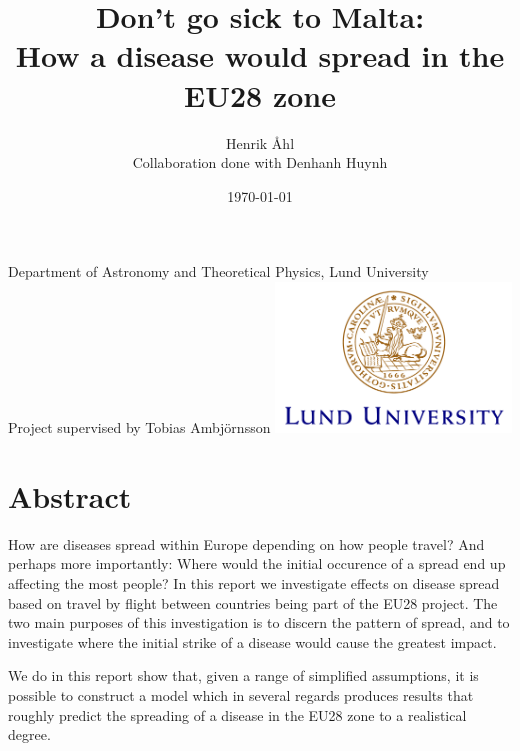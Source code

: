 \documentclass[a4paper,12pt]{article}
\title
{
	\textbf
	{
   Don't go sick to Malta:\\
   How a disease would spread in the EU28 zone
   }
}
\author{Henrik Åhl\\
\small{Collaboration done with Denhanh Huynh}}
\date{\today}
\theoremstyle{plain}
\theoremstyle{definition}
\begin{document}
\begin{titlepage}
	
   \maketitle 
	\begin{center}
		\phantom{a}
		{Department of Astronomy and Theoretical Physics, Lund University}
		\\[2cm]
		{Project supervised by Tobias Ambjörnsson}
		\vfill
		\includegraphics[height=4cm]{logocLUeng.pdf}
	\end{center}
	\thispagestyle{empty} %
\end{titlepage}
\section*{Abstract}
   How are diseases spread within Europe depending on how people travel?
   And perhaps more importantly: Where would the initial occurence of a spread end
   up affecting the most people? In this report we investigate effects on
   disease spread based on travel by flight between countries being part of the
   EU28 project. The two main purposes of this investigation is to discern the
   pattern of spread, and to investigate where the initial strike of a disease
   would cause the greatest impact.

   We do in this report show that, given a range of simplified assumptions, it
   is possible to construct a model which in several regards produces results
   that roughly predict the spreading of a disease in the EU28 zone to a
   realistical degree. 

\newpage
\end{document}
